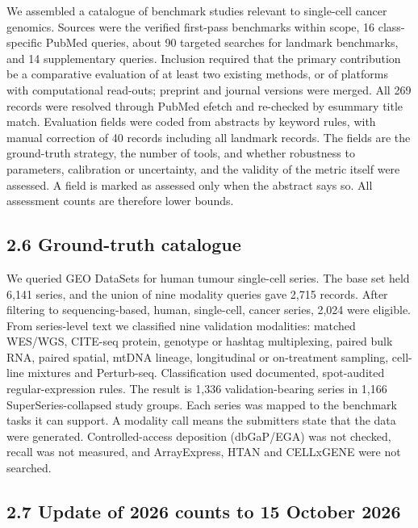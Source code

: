 \documentclass[11pt]{article}
\begin{document}
We assembled a catalogue of benchmark studies relevant to single-cell
cancer genomics. Sources were the verified first-pass benchmarks within
scope, 16 class-specific PubMed queries, about 90 targeted searches for
landmark benchmarks, and 14 supplementary queries. Inclusion required
that the primary contribution be a comparative evaluation of at least
two existing methods, or of platforms with computational read-outs;
preprint and journal versions were merged. All 269 records were resolved
through PubMed efetch and re-checked by esummary title match. Evaluation
fields were coded from abstracts by keyword rules, with manual
correction of 40 records including all landmark records. The fields are
the ground-truth strategy, the number of tools, and whether robustness
to parameters, calibration or uncertainty, and the validity of the
metric itself were assessed. A field is marked as assessed only when the
abstract says so. All assessment counts are therefore lower bounds.

\subsection{2.6 Ground-truth catalogue}\label{ground-truth-catalogue}

We queried GEO DataSets for human tumour single-cell series. The base
set held 6,141 series, and the union of nine modality queries gave 2,715
records. After filtering to sequencing-based, human, single-cell, cancer
series, 2,024 were eligible. From series-level text we classified nine
validation modalities: matched WES/WGS, CITE-seq protein, genotype or
hashtag multiplexing, paired bulk RNA, paired spatial, mtDNA lineage,
longitudinal or on-treatment sampling, cell-line mixtures and
Perturb-seq. Classification used documented, spot-audited
regular-expression rules. The result is 1,336 validation-bearing series
in 1,166 SuperSeries-collapsed study groups. Each series was mapped to
the benchmark tasks it can support. A modality call means the submitters
state that the data were generated. Controlled-access deposition
(dbGaP/EGA) was not checked, recall was not measured, and ArrayExpress,
HTAN and CELLxGENE were not searched.

\subsection{2.7 Update of 2026 counts to 15 October 2026}\label{update-of-2026-counts-to-15-october-2026}
\end{document}
